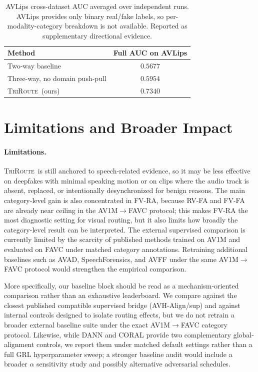 \documentclass{article}
\newcommand{\method}{\textsc{TriRoute}}
\begin{document}
\begin{table}[t]
    \centering
    \caption{AVLips cross-dataset AUC averaged over independent runs. AVLips provides only binary real/fake labels, so per-modality-category breakdown is not available. Reported as supplementary directional evidence.}
    \label{tab:avlips}
    \small
    \begin{tabular}{lc}
        \toprule
        Method & Full AUC on AVLips \\
        \midrule
        Two-way baseline &  $0.5677$ \\
        Three-way, no domain push-pull &  $0.5954$ \\
        \method\ (ours) & $\mathbf{0.7340}$ \\
        \bottomrule
    \end{tabular}
\end{table}

\section{Limitations and Broader Impact}

\paragraph{Limitations.}
\method\ is still anchored to speech-related evidence, so it may be less effective on deepfakes with minimal speaking motion or on clips where the audio track is absent, replaced, or intentionally desynchronized for benign reasons. The main category-level gain is also concentrated in FV-RA, because RV-FA and FV-FA are already near ceiling in the AV1M$\rightarrow$FAVC protocol; this makes FV-RA the most diagnostic setting for visual routing, but it also limits how broadly the category-level result can be interpreted. The external supervised comparison is currently limited by the scarcity of published methods trained on AV1M and evaluated on FAVC under matched category annotations. Retraining additional baselines such as AVAD, SpeechForensics, and AVFF under the same AV1M$\rightarrow$FAVC protocol would strengthen the empirical comparison.

More specifically, our baseline block should be read as a mechanism-oriented comparison rather than an exhaustive leaderboard. We compare against the closest published compatible supervised bridge (AVH-Align/sup) and against internal controls designed to isolate routing effects, but we do not retrain a broader external baseline suite under the exact AV1M$\rightarrow$FAVC category protocol. Likewise, while DANN and CORAL provide two complementary global-alignment controls, we report them under matched default settings rather than a full GRL hyperparameter sweep; a stronger baseline audit would include a broader $\alpha$ sensitivity study and possibly alternative adversarial schedules.
\end{document}
